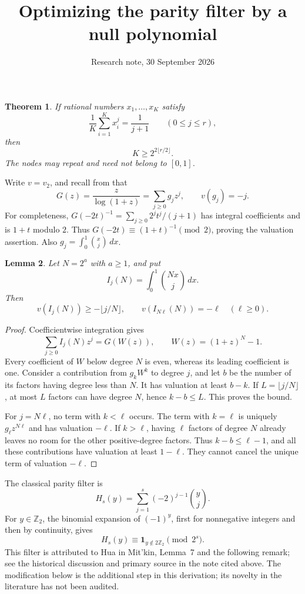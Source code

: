 \documentclass[11pt]{article}
\title{Optimizing the parity filter by a null polynomial}
\author{Research note, 30 September 2026}
\date{}
\newtheorem{theorem}{Theorem}
\newtheorem{lemma}[theorem]{Lemma}
\newcommand{\Z}{\mathbb Z}
\begin{document}
\maketitle

\begin{theorem}\label{main}
If rational numbers $x_1,\ldots,x_K$ satisfy
\[
 \frac1K\sum_{i=1}^K x_i^j=\frac1{j+1}\qquad(0\le j\le r),
\]
then
\[
 K\ge 2^{2\lfloor r/2\rfloor}.
\]
The nodes may repeat and need not belong to $[0,1]$.
\end{theorem}

Write $v=v_2$, and recall from
 that
\[
 G(z)=\frac z{\log(1+z)}=\sum_{j\ge0}g_jz^j,
 \qquad v(g_j)=-j.
\]
For completeness, $G(-2t)^{-1}=\sum_{j\ge0}2^jt^j/(j+1)$
has integral coefficients and is $1+t$ modulo $2$.
Thus $G(-2t)\equiv(1+t)^{-1}\pmod2$, proving the valuation assertion.
Also $g_j=\int_0^1\binom{x}{j}\,dx$.

\begin{lemma}\label{dilation}
Let $N=2^a$ with $a\ge1$, and put
\[
 I_j(N)=\int_0^1\binom{Nx}{j}\,dx.
\]
Then
\[
 v(I_j(N))\ge-\lfloor j/N\rfloor,
 \qquad v(I_{N\ell}(N))=-\ell\quad(\ell\ge0).
\]
\end{lemma}
\begin{proof}
Coefficientwise integration gives
\[
 \sum_{j\ge0}I_j(N)z^j=G(W(z)),
 \qquad W(z)=(1+z)^N-1.
\]
Every coefficient of $W$ below degree $N$ is even, whereas its leading
coefficient is one. Consider a contribution from $g_kW^k$ to degree $j$,
and let $b$ be the number of its factors having degree less than $N$.
It has valuation at least $b-k$. If $L=\lfloor j/N\rfloor$, at most
$L$ factors can have degree $N$, hence $k-b\le L$. This proves the bound.

For $j=N\ell$, no term with $k<\ell$ occurs. The term with
$k=\ell$ is uniquely $g_\ell z^{N\ell}$ and has valuation $-\ell$.
If $k>\ell$, having $\ell$ factors of degree $N$ already leaves no room
for the other positive-degree factors. Thus $k-b\le\ell-1$, and all
these contributions have valuation at least $1-\ell$. They cannot
cancel the unique term of valuation $-\ell$.
\end{proof}

The classical parity filter is
\[
 H_s(y)=\sum_{j=1}^s(-2)^{j-1}\binom yj.
\]
For $y\in\Z_2$, the binomial expansion of $(-1)^y$, first for
nonnegative integers and then by continuity, gives
\[
 H_s(y)\equiv\boldsymbol1_{y\notin2\Z_2}\pmod{2^s}.
\]
This filter is attributed to Hua in Mit'kin, Lemma~7 and the following
remark; see the historical discussion and primary source in the note
cited above. The modification below is the additional step in this
derivation; its novelty in the literature has not been audited.
\end{document}
